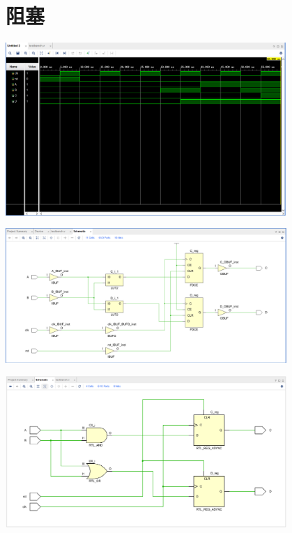\documentclass{article} %
\begin{document}
\section{阻塞}
\includegraphics[width=0.8\textwidth]{11.png}\par
\includegraphics[width=0.8\textwidth]{12.png}\par
\includegraphics[width=0.8\textwidth]{13.png}\par
\end{document}
